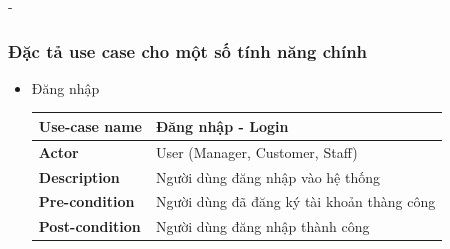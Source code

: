 \begin {list} {-}{}
\subsubsection{Đặc tả use case cho một số tính năng chính}
\begin{itemize}
    \item Đăng nhập
    \begin{table}[h]
        \begin{tabular}{|l|l|}
        \hline
        \textbf{Use-case name}    & \textbf{Đăng nhập - Login}                                                                                                                                                                                                                                                                                                                                                                                                                           \\ \hline
        \textbf{Actor}            & User (Manager, Customer, Staff)                                                                                                                                                                                                                                                                                                                                                                                                                      \\ \hline
        \textbf{Description}      & Người dùng đăng nhập vào hệ thống                                                                                                                                                                                                                                                                                                                                                                                                                    \\ \hline
        \textbf{Pre-condition}    & Người dùng đã đăng ký tài khoản thàng công                                                                                                                                                                                                                                                                                                                                                                                                           \\ \hline
        \textbf{Post-condition}   & Người dùng đăng nhập thành công                                                                                                                                                                                                                                                                                                                                                                                                                      \\ \hline

\end{tabular}
\end{table}
\end{itemize}
\end{list}
